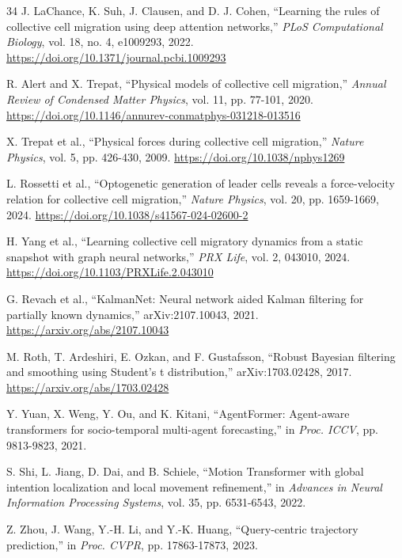 \documentclass[11pt,a4paper]{article}
\begin{document}
\begingroup
\footnotesize{}
\begin{thebibliography}{34}
\setlength{\itemsep}{1pt}
\setlength{\parsep}{0pt}
 J. LaChance, K. Suh, J. Clausen, and D. J. Cohen, “Learning the rules of collective cell migration using deep attention networks,” \textit{PLoS Computational Biology}, vol. 18, no. 4, e1009293, 2022. \url{https://doi.org/10.1371/journal.pcbi.1009293}

 R. Alert and X. Trepat, “Physical models of collective cell migration,” \textit{Annual Review of Condensed Matter Physics}, vol. 11, pp. 77-101, 2020. \url{https://doi.org/10.1146/annurev-conmatphys-031218-013516}

 X. Trepat et al., “Physical forces during collective cell migration,” \textit{Nature Physics}, vol. 5, pp. 426-430, 2009. \url{https://doi.org/10.1038/nphys1269}

 L. Rossetti et al., “Optogenetic generation of leader cells reveals a force-velocity relation for collective cell migration,” \textit{Nature Physics}, vol. 20, pp. 1659-1669, 2024. \url{https://doi.org/10.1038/s41567-024-02600-2}

 H. Yang et al., “Learning collective cell migratory dynamics from a static snapshot with graph neural networks,” \textit{PRX Life}, vol. 2, 043010, 2024. \url{https://doi.org/10.1103/PRXLife.2.043010}

 G. Revach et al., “KalmanNet: Neural network aided Kalman filtering for partially known dynamics,” arXiv:2107.10043, 2021. \url{https://arxiv.org/abs/2107.10043}

 M. Roth, T. Ardeshiri, E. Ozkan, and F. Gustafsson, “Robust Bayesian filtering and smoothing using Student's t distribution,” arXiv:1703.02428, 2017. \url{https://arxiv.org/abs/1703.02428}

 Y. Yuan, X. Weng, Y. Ou, and K. Kitani, “AgentFormer: Agent-aware transformers for socio-temporal multi-agent forecasting,” in \textit{Proc. ICCV}, pp. 9813-9823, 2021.

 S. Shi, L. Jiang, D. Dai, and B. Schiele, “Motion Transformer with global intention localization and local movement refinement,” in \textit{Advances in Neural Information Processing Systems}, vol. 35, pp. 6531-6543, 2022.

 Z. Zhou, J. Wang, Y.-H. Li, and Y.-K. Huang, “Query-centric trajectory prediction,” in \textit{Proc. CVPR}, pp. 17863-17873, 2023.


\end{thebibliography}
\end{document}
